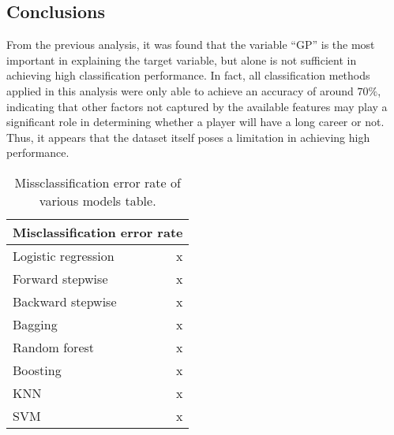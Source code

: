 \subsection{Conclusions}

From the previous analysis, it was found that the variable ``GP'' is the most important in explaining the target variable, but alone is not sufficient in achieving high classification performance. In fact, all classification methods applied in this analysis were only able to achieve an accuracy of around $70\%$, indicating that other factors not captured by the available features may play a significant role in determining whether a player will have a long career or not. Thus, it appears that the dataset itself poses a limitation in achieving high performance.

\begin{table}[H]
	\centering
	\begin{tabular}{|| l | r ||} 
		\hline
		\multicolumn{2}{|c|}{Misclassification error rate} \\
		\hline
		Logistic regression & x \\
		\hline
		Forward stepwise & x \\
		\hline
		Backward stepwise & x \\
		\hline
		Bagging & x \\
		\hline
		Random forest & x \\
		\hline
		Boosting & x \\
		\hline
		KNN & x \\
		\hline
		SVM & x \\
		\hline
	\end{tabular}
	\caption{Missclassification error rate of various models table.}
	\label{table:ClasEvalParams}
\end{table}